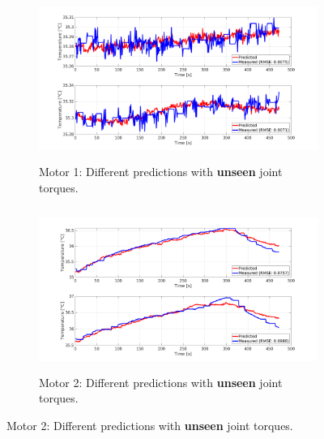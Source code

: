 \documentclass{ifacconf}
\begin{document}
\begin{figure}[t!]
	\begin{subfigure}[t]{0.5\textwidth} 
		\centering 
		\includegraphics[height=2.1in, width=\linewidth, keepaspectratio]{./pictures/applications/feedback/new/j1_legend_rmse_l_20.png}
		\caption{Motor 1: Different predictions with \textbf{unseen} joint torques.}
	\end{subfigure}%
	\begin{subfigure}[t]{0.5\textwidth}
		\centering
		\includegraphics[height=2.1in, width=\linewidth, keepaspectratio]{./pictures/applications/feedback/new/j2_legend_rmse_l_20.png}
		\caption{Motor 2: Different predictions with \textbf{unseen} joint torques.}
	\end{subfigure}

    \vspace{1ex} 


\end{figure}
\end{document}
